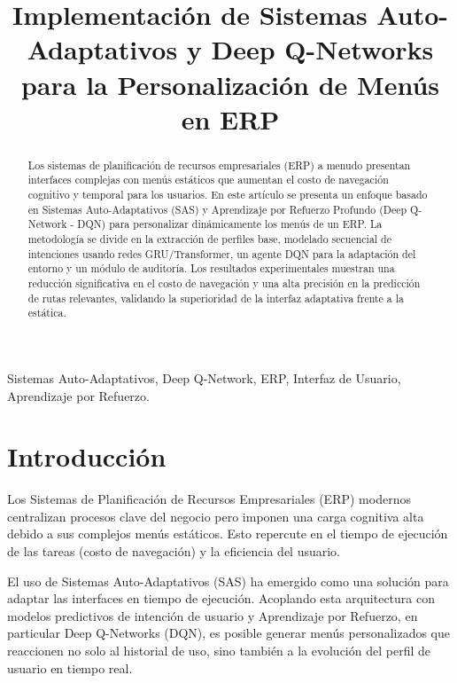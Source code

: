 \documentclass[conference]{IEEEtran}
\begin{document}
\title{Implementación de Sistemas Auto-Adaptativos y Deep Q-Networks para la Personalización de Menús en ERP\\
}

\author{
}

\maketitle

\begin{abstract}
Los sistemas de planificación de recursos empresariales (ERP) a menudo presentan interfaces complejas con menús estáticos que aumentan el costo de navegación cognitivo y temporal para los usuarios. En este artículo se presenta un enfoque basado en Sistemas Auto-Adaptativos (SAS) y Aprendizaje por Refuerzo Profundo (Deep Q-Network - DQN) para personalizar dinámicamente los menús de un ERP. La metodología se divide en la extracción de perfiles base, modelado secuencial de intenciones usando redes GRU/Transformer, un agente DQN para la adaptación del entorno y un módulo de auditoría. Los resultados experimentales muestran una reducción significativa en el costo de navegación y una alta precisión en la predicción de rutas relevantes, validando la superioridad de la interfaz adaptativa frente a la estática.
\end{abstract}

\begin{IEEEkeywords}
Sistemas Auto-Adaptativos, Deep Q-Network, ERP, Interfaz de Usuario, Aprendizaje por Refuerzo.
\end{IEEEkeywords}

\section{Introducción}
Los Sistemas de Planificación de Recursos Empresariales (ERP) modernos centralizan procesos clave del negocio pero imponen una carga cognitiva alta debido a sus complejos menús estáticos. Esto repercute en el tiempo de ejecución de las tareas (costo de navegación) y la eficiencia del usuario.

El uso de Sistemas Auto-Adaptativos (SAS) ha emergido como una solución para adaptar las interfaces en tiempo de ejecución. Acoplando esta arquitectura con modelos predictivos de intención de usuario y Aprendizaje por Refuerzo, en particular Deep Q-Networks (DQN), es posible generar menús personalizados que reaccionen no solo al historial de uso, sino también a la evolución del perfil de usuario en tiempo real.
\end{document}
